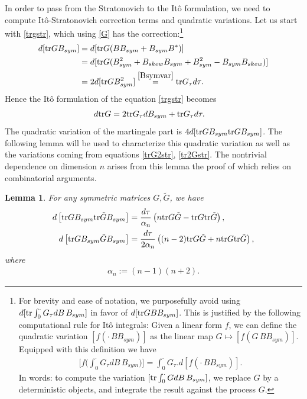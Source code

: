 \documentclass[english, letterpaper,12pt,reqno]{amsart}
\newtheorem{lemma}[theorem]{Lemma}
\theoremstyle{remark}
\theoremstyle{plain}
\newcommand{\1}{\mathbf{1}}
\def\tr{{\rm tr}}
\begin{document}
\noindent
In order to pass from the Stratonovich to the Itô formulation, we need to compute Itô-Stratonovich correction terms and quadratic variations. Let us start with \eqref{trgstr}, which using \eqref{G} has the correction:\footnote{ For brevity and ease of notation, we purposefully avoid using $d[\tr \int_0^{\cdot} G_{\tau} dB  \, B_{sym}]$ in favor of $d[\tr G B B_{sym}]$. This is justified by the following computational rule for Itô integrals: Given a linear form $ f $, we can define the quadratic variation $ [ f ( \cdot \, B B_{ sym } ) ] $ as the linear map $ G \mapsto [ f ( G \, BB_{ sym } ) ] $. Equipped with this definition we have
%
\begin{align*}
	\Big[ f \big( \int_0^{ \cdot } G_{ \tau } d B \, B_{ sym } \big) \Big] 
	= \int_0^{ \cdot } G_{ \tau } .  d [ f ( \cdot \, B B_{ sym } ) ] .
\end{align*}
%
In words: to compute the variation $ [\tr \int_0^{\cdot} G dB  \, B_{sym}] $, we replace $ G $ by a deterministic objects, and integrate the result against the process $ G $.}
 \begin{align} \begin{aligned}
    d[\tr G B_{sym}]&=d[\tr G (B B_{sym} +B_{sym}B^*)]\\& =  d[\tr G (B_{ sym}^2+B_{skew}B_{sym}+B_{sym}^2- B_{sym}B_{skew})]\\ & = 2 d[\tr G B^2_{ sym}]\overset{\eqref{Bsymvar}}{=}\tr G_\tau d\tau. \end{aligned} \label{itostra}
\end{align}
Hence the Itô formulation of the equation \eqref{trgstr} becomes \begin{align}
    d\tr G &=2\tr G_\tau dB_{sym}+\tr G_\tau d\tau. \label{trg} 
\end{align} 
%
The quadratic variation of the martingale part is $  4  d[\tr  G B_{ sym} \tr  G B_{ sym}]$. The following lemma will be used to characterize this quadratic variation as well as the variations coming from equations \eqref{trG2str}, \eqref{tr2Gstr}. The nontrivial dependence on dimension $n$ arises from this lemma the proof of which relies on combinatorial arguments. 
%
\begin{lemma} \label{lem:quadraticvar} For any symmetric matrices $ G,\tilde G$, we have 
%
\begin{align}
      d\left[\tr G B_{sym} \tr \tilde G B_{sym}\right]&=  \frac{d\tau}{\alpha_n} \left(n \tr G \tilde G - \tr G \tr \tilde G \right),\label{trGBtrGB}\\  d\left[ \tr GB_{sym}  \tilde G B_{sym}\right]&=\frac{d\tau}{2\alpha_n}\left( (n-2) \tr G \tilde G +n\tr G \tr \tilde G \right), \label{trGBGB}
\end{align}
%
where 
%
\begin{align}
    \alpha_n := (n-1)(n+2). \label{alpha}
\end{align}
%
\end{lemma}
\end{document}
